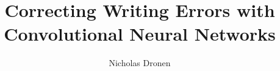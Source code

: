 \documentclass[19pt,mathserif,serif]{beamer}
\begin{document}
\title{Correcting Writing Errors with Convolutional Neural Networks}
\author[shortname]{Nicholas Dronen }

\maketitle
















    
\end{document}

